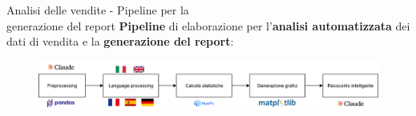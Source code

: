 \documentclass{beamer}
\begin{document}
	\begin{frame}{Analisi delle vendite - Pipeline per la\\ generazione del report}
		\textbf{Pipeline} di elaborazione per l'\textbf{analisi automatizzata} dei dati di vendita e la \textbf{generazione del report}:

		\begin{figure}
			\centering
			\includegraphics[width=\textwidth]{Diagramma pipeline analisi delle vendite.png}
		\end{figure}
	\end{frame}
\end{document}
